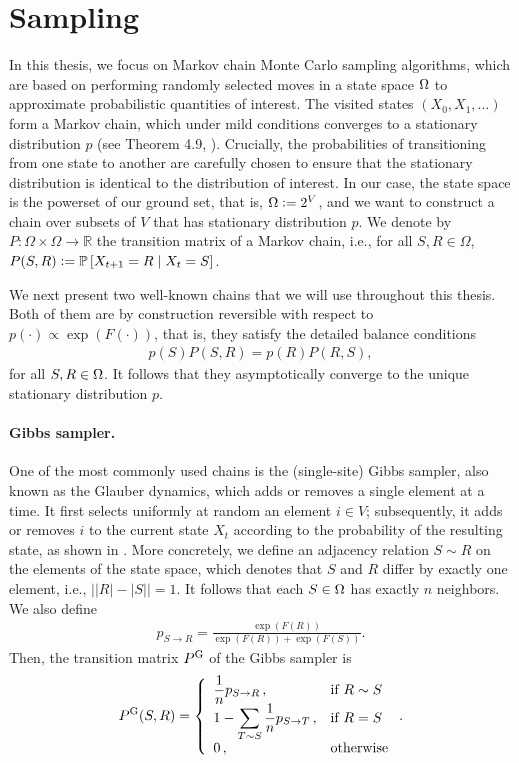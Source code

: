 \section{Sampling} \label{sect:sampling}
In this thesis, we focus on Markov chain Monte Carlo sampling algorithms, which are based on performing randomly selected moves in a state space $\ss$ to approximate probabilistic quantities of interest.
The visited states $(X_0, X_1,\ldots)$ form a Markov chain, which under mild conditions converges to a stationary distribution $p$ (see Theorem 4.9, \citealp{levin08book}).
Crucially, the probabilities of transitioning from one state to another are carefully chosen to ensure that the stationary distribution is identical to the distribution of interest.
In our case, the state space is the powerset of our ground set, that is, $\ss \defeq 2^V$, and we want to construct a chain over subsets of $V$ that has stationary distribution $p$.
We denote by $P : \Omega \times \Omega \to \mathbb{R}$ the transition matrix of a Markov chain, i.e., for all $S, R \in \Omega$, $P(S, R) \defeq \P\left[ X_{t+1} = R \mid X_t = S \right]$.

We next present two well-known chains that we will use throughout this thesis.
Both of them are by construction reversible with respect to $p(\cdot) \propto \exp(F(\cdot))$, that is, they satisfy the detailed balance conditions
\begin{align*}
p(S) P(S, R) = p(R) P(R, S),
\end{align*}
for all $S, R \in \ss$.
It follows that they asymptotically converge to the unique stationary distribution $p$.

\paragraph{Gibbs sampler.}
One of the most commonly used chains is the (single-site) Gibbs sampler, also known as the Glauber dynamics, which adds or removes a single element at a time.
It first selects uniformly at random an element $i \in V$; subsequently, it adds or removes $i$ to the current state $X_t$ according to the probability of the resulting state, as shown in .
More concretely, we define an adjacency relation $S \sim R$ on the elements of the state space, which denotes that $S$ and $R$ differ by exactly one element, i.e., $\big||R| - |S|\big| = 1$.
It follows that each $S \in \ss$ has exactly $n$ neighbors.
We also define
\begin{align*}
p_{S \rightarrow R} = \displaystyle\frac{\exp(F(R))}{\exp(F(R)) + \exp(F(S))}.
\end{align*}
Then, the transition matrix $\Pg$ of the Gibbs sampler is
\begin{align*}
  \Pg(S, R) = 
  \threepartdefo{\displaystyle\frac{1}{n}p_{S \rightarrow R}}{R \sim S}{1 - \displaystyle\sum_{T \sim S} \displaystyle\frac{1}{n}p_{S \rightarrow T}}{R = S}{0}.
\end{align*}

